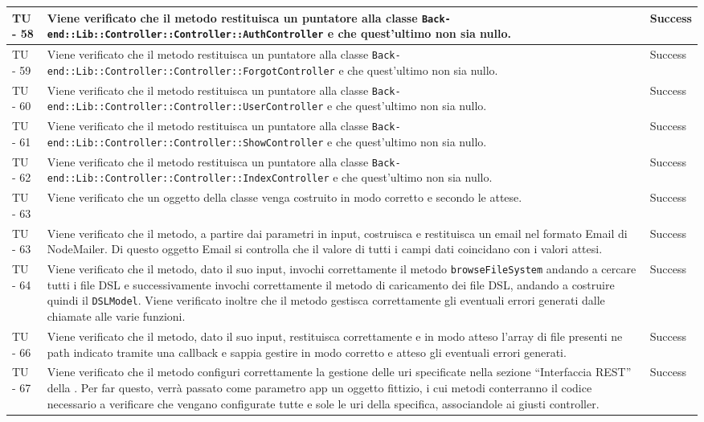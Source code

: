 \begin{center}
\begin{longtable}{ | p{3cm} | p{9cm} | p{2cm} | }
TU - 58 & Viene verificato che il metodo restituisca un puntatore alla classe \texttt{Back-end::Lib::Controller::Controller::AuthController} e che quest'ultimo non sia nullo. & Success \\ \hline
TU - 59 & Viene verificato che il metodo restituisca un puntatore alla classe \texttt{Back-end::Lib::Controller::Controller::ForgotController} e che quest'ultimo non sia nullo. & Success \\ \hline
TU - 60 & Viene verificato che il metodo restituisca un puntatore alla classe \texttt{Back-end::Lib::Controller::Controller::UserController} e che quest'ultimo non sia nullo. & Success \\ \hline
TU - 61 & Viene verificato che il metodo restituisca un puntatore alla classe \texttt{Back-end::Lib::Controller::Controller::ShowController} e che quest'ultimo non sia nullo. & Success \\ \hline
TU - 62 & Viene verificato che il metodo restituisca un puntatore alla classe \texttt{Back-end::Lib::Controller::Controller::IndexController} e che quest'ultimo non sia nullo. & Success \\ \hline
TU - 63 & Viene verificato che un oggetto della classe venga costruito in modo corretto e secondo le attese. & Success \\ \hline
TU - 63 & Viene verificato che il metodo, a partire dai parametri in input, costruisca e restituisca un email nel formato Email di NodeMailer. Di questo oggetto Email si controlla che il valore di tutti i campi dati coincidano con i valori attesi. & Success \\ \hline
TU - 64 & Viene verificato che il metodo, dato il suo input, invochi correttamente il metodo \texttt{browseFileSystem} andando a cercare tutti i file DSL e successivamente invochi correttamente il metodo di caricamento dei file DSL, andando a costruire quindi il \texttt{DSLModel}. Viene verificato inoltre che il metodo gestisca correttamente gli eventuali errori generati dalle chiamate alle varie funzioni. & Success \\ \hline
TU - 66 & Viene verificato che il metodo, dato il suo input, restituisca  correttamente e in modo atteso l'array di file presenti ne path indicato tramite una callback e sappia gestire in modo corretto e atteso gli eventuali errori generati. & Success \\ \hline
TU - 67 & Viene verificato che il metodo configuri correttamente la gestione delle uri specificate nella sezione ``Interfaccia REST'' della \SpecificaTecnica{}. Per far questo, verrà passato come parametro app un oggetto fittizio, i cui metodi conterranno il codice necessario a verificare che vengano configurate tutte e sole le uri della specifica, associandole ai giusti controller. & Success \\ \hline

\end{longtable}
\end{center}
